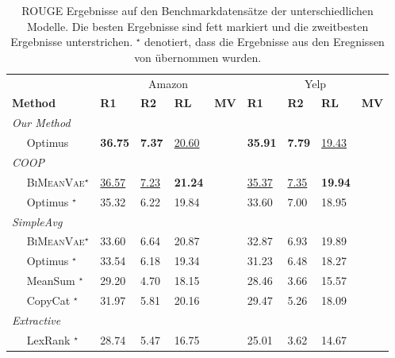 \begin{table}[!h]
    \label{eval_results}
    \centering
    \begin{tabular}{@{}lllllllll@{}}
    \toprule
                               & \multicolumn{4}{c}{Amazon} & \multicolumn{4}{c}{Yelp} \\ 
    \textbf{Method} & \textbf{R1} & \textbf{R2} & \textbf{RL} & \textbf{MV} & \textbf{R1} & \textbf{R2} & \textbf{RL} & \textbf{MV}\\ \midrule
    \textit{Our Method}        &         &         &        &        &        &   & &     \\
    $\quad$ Optimus            &     \textbf{36.75}    &   \textbf{7.37}      &     \underline{20.60}  & &   \textbf{35.91}   &   \textbf{7.79}       & \underline{19.43}   &    \\ \midrule
    \textit{COOP}              &         &         &        &        &        & &   &    \\
    $\quad$ \textsc{BiMeanVae}$^{\star}$ & \underline{36.57}    & \underline{7.23}   & \textbf{21.24} & & \underline{35.37}  & \underline{7.35}  & \textbf{19.94} & \\
    $\quad$ Optimus $^{\star}$           & 35.32   & 6.22    & 19.84 & & 33.60  & 7.00   & 18.95 & \\ \midrule
    \textit{SimpleAvg}         &         &         &        &      &  &        &        \\
    $\quad$ \textsc{BiMeanVae}$^{\star}$ & 33.60   & 6.64    & 20.87 & & 32.87  & 6.93   & 19.89 & \\
    $\quad$ Optimus  $^{\star}$          & 33.54   & 6.18    & 19.34 & & 31.23  & 6.48   & 18.27 & \\
    $\quad$ MeanSum  $^{\star}$          & 29.20   & 4.70    & 18.15 & & 28.46  & 3.66   & 15.57 & \\
    $\quad$ CopyCat  $^{\star}$          & 31.97   & 5.81    & 20.16 & & 29.47  & 5.26   & 18.09 & \\ \midrule
    \textit{Extractive}        &         &         &        &      &  &        &  &      \\
    $\quad$ LexRank  $^{\star}$          & 28.74   & 5.47    & 16.75 & & 25.01  & 3.62   & 14.67 & \\ \bottomrule
    \end{tabular}
    \caption{ROUGE Ergebnisse auf den Benchmarkdatensätze der unterschiedlichen Modelle. Die besten Ergebnisse sind fett markiert und die zweitbesten Ergebnisse unterstrichen.
    $^{\star}$ denotiert, dass die Ergebnisse aus den Eregnissen von \citep{coop} übernommen wurden.}
\end{table}

\pagebreak

